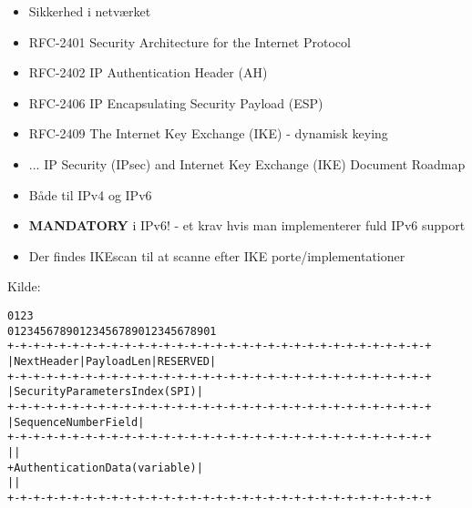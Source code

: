 \documentclass[Screen16to9,17pt]{foils}
\begin{document}
\begin{itemize}
\item Sikkerhed i netværket
\item RFC-2401 Security Architecture for the Internet Protocol
\item RFC-2402 IP Authentication Header (AH)
\item RFC-2406 IP Encapsulating Security Payload (ESP)
\item RFC-2409 The Internet Key Exchange (IKE) - dynamisk keying
\item ... IP Security (IPsec) and Internet Key Exchange (IKE) Document Roadmap\\
\item Både til IPv4 og IPv6
\item {\bfseries MANDATORY} i IPv6! - et krav hvis man implementerer
  fuld IPv6 support
\item Der findes IKEscan til at scanne efter IKE
  porte/implementationer\\
\end{itemize}




\centerline{Kilde: }



\begin{alltt}
\small
    0                   1                   2                   3
    0 1 2 3 4 5 6 7 8 9 0 1 2 3 4 5 6 7 8 9 0 1 2 3 4 5 6 7 8 9 0 1
   +-+-+-+-+-+-+-+-+-+-+-+-+-+-+-+-+-+-+-+-+-+-+-+-+-+-+-+-+-+-+-+-+
   | Next Header   |  Payload Len  |          RESERVED             |
   +-+-+-+-+-+-+-+-+-+-+-+-+-+-+-+-+-+-+-+-+-+-+-+-+-+-+-+-+-+-+-+-+
   |                 Security Parameters Index (SPI)               |
   +-+-+-+-+-+-+-+-+-+-+-+-+-+-+-+-+-+-+-+-+-+-+-+-+-+-+-+-+-+-+-+-+
   |                    Sequence Number Field                      |
   +-+-+-+-+-+-+-+-+-+-+-+-+-+-+-+-+-+-+-+-+-+-+-+-+-+-+-+-+-+-+-+-+
   |                                                               |
   +                Authentication Data (variable)                 |
   |                                                               |
   +-+-+-+-+-+-+-+-+-+-+-+-+-+-+-+-+-+-+-+-+-+-+-+-+-+-+-+-+-+-+-+-+
\end{alltt}
\end{document}

